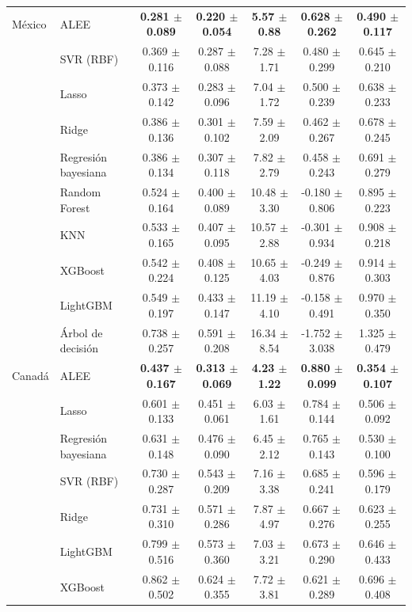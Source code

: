 \begin{longtable}{llccccc}
\midrule
México & ALEE & \textbf{0.281 $\pm$ 0.089} & \textbf{0.220 $\pm$ 0.054} & \textbf{5.57 $\pm$ 0.88} & \textbf{0.628 $\pm$ 0.262} & \textbf{0.490 $\pm$ 0.117} \\
 & SVR (RBF) & 0.369 $\pm$ 0.116 & 0.287 $\pm$ 0.088 & 7.28 $\pm$ 1.71 & 0.480 $\pm$ 0.299 & 0.645 $\pm$ 0.210 \\
 & Lasso & 0.373 $\pm$ 0.142 & 0.283 $\pm$ 0.096 & 7.04 $\pm$ 1.72 & 0.500 $\pm$ 0.239 & 0.638 $\pm$ 0.233 \\
 & Ridge & 0.386 $\pm$ 0.136 & 0.301 $\pm$ 0.102 & 7.59 $\pm$ 2.09 & 0.462 $\pm$ 0.267 & 0.678 $\pm$ 0.245 \\
 & Regresión bayesiana & 0.386 $\pm$ 0.134 & 0.307 $\pm$ 0.118 & 7.82 $\pm$ 2.79 & 0.458 $\pm$ 0.243 & 0.691 $\pm$ 0.279 \\
 & Random Forest & 0.524 $\pm$ 0.164 & 0.400 $\pm$ 0.089 & 10.48 $\pm$ 3.30 & -0.180 $\pm$ 0.806 & 0.895 $\pm$ 0.223 \\
 & KNN & 0.533 $\pm$ 0.165 & 0.407 $\pm$ 0.095 & 10.57 $\pm$ 2.88 & -0.301 $\pm$ 0.934 & 0.908 $\pm$ 0.218 \\
 & XGBoost & 0.542 $\pm$ 0.224 & 0.408 $\pm$ 0.125 & 10.65 $\pm$ 4.03 & -0.249 $\pm$ 0.876 & 0.914 $\pm$ 0.303 \\
 & LightGBM & 0.549 $\pm$ 0.197 & 0.433 $\pm$ 0.147 & 11.19 $\pm$ 4.10 & -0.158 $\pm$ 0.491 & 0.970 $\pm$ 0.350 \\
 & Árbol de decisión & 0.738 $\pm$ 0.257 & 0.591 $\pm$ 0.208 & 16.34 $\pm$ 8.54 & -1.752 $\pm$ 3.038 & 1.325 $\pm$ 0.479 \\
\midrule
Canadá & ALEE & \textbf{0.437 $\pm$ 0.167} & \textbf{0.313 $\pm$ 0.069} & \textbf{4.23 $\pm$ 1.22} & \textbf{0.880 $\pm$ 0.099} & \textbf{0.354 $\pm$ 0.107} \\
 & Lasso & 0.601 $\pm$ 0.133 & 0.451 $\pm$ 0.061 & 6.03 $\pm$ 1.61 & 0.784 $\pm$ 0.144 & 0.506 $\pm$ 0.092 \\
 & Regresión bayesiana & 0.631 $\pm$ 0.148 & 0.476 $\pm$ 0.090 & 6.45 $\pm$ 2.12 & 0.765 $\pm$ 0.143 & 0.530 $\pm$ 0.100 \\
 & SVR (RBF) & 0.730 $\pm$ 0.287 & 0.543 $\pm$ 0.209 & 7.16 $\pm$ 3.38 & 0.685 $\pm$ 0.241 & 0.596 $\pm$ 0.179 \\
 & Ridge & 0.731 $\pm$ 0.310 & 0.571 $\pm$ 0.286 & 7.87 $\pm$ 4.97 & 0.667 $\pm$ 0.276 & 0.623 $\pm$ 0.255 \\
 & LightGBM & 0.799 $\pm$ 0.516 & 0.573 $\pm$ 0.360 & 7.03 $\pm$ 3.21 & 0.673 $\pm$ 0.290 & 0.646 $\pm$ 0.433 \\
 & XGBoost & 0.862 $\pm$ 0.502 & 0.624 $\pm$ 0.355 & 7.72 $\pm$ 3.81 & 0.621 $\pm$ 0.289 & 0.696 $\pm$ 0.408 \\

\end{longtable}
